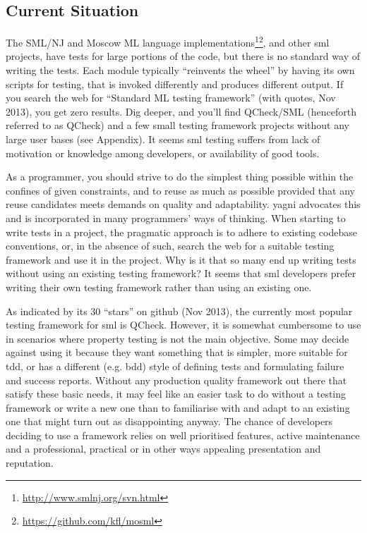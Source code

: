 \documentclass[11pt]{article}
\begin{document}
\subsection{Current Situation}

The SML/NJ and Moscow ML language implementations\footnote{\url{http://www.smlnj.org/svn.html}}\footnote{\url{https://github.com/kfl/mosml}}, and other \gls{sml} projects, have tests for large portions of the code, but there is no standard way of writing the tests. Each module typically ``reinvents the wheel'' by having its own scripts for testing, that is invoked differently and produces different output. If you search the web for ``Standard ML testing framework'' (with quotes, Nov 2013), you get zero results. Dig deeper, and you'll find QCheck/SML (henceforth referred to as QCheck) and a few small testing framework projects without any large user bases (see Appendix). It seems \gls{sml} testing suffers from lack of motivation or knowledge among developers, or availability of good tools. %

As a programmer, you should strive to do the simplest thing possible within the confines of given constraints, and to reuse as much as possible provided that any reuse candidates meets demands on quality and adaptability. \Gls{yagni} advocates this and is incorporated in many programmers' ways of thinking. When starting to write tests in a project, the pragmatic approach is to adhere to existing codebase conventions, or, in the absence of such, search the web for a suitable testing framework and use it in the project. Why is it that so many end up writing tests without using an existing testing framework? It seems that \gls{sml} developers prefer writing their own testing framework rather than using an existing one.

As indicated by its 30 ``stars'' on github (Nov 2013), the currently most popular testing framework for \gls{sml} is QCheck. However, it is somewhat cumbersome to use in scenarios where property testing is not the main objective. Some may decide against using it because they want something that is simpler, more suitable for \gls{tdd}, or has a different (e.g. \gls{bdd}) style of defining tests and formulating failure and success reports. Without any production quality framework out there that satisfy these basic needs, it may feel like an easier task to do without a testing framework or write a new one than to familiarise with and adapt to an existing one that might turn out as disappointing anyway. The chance of developers deciding to use a framework relies on well prioritised features, active maintenance and a professional, practical or in other ways appealing presentation and reputation.
\end{document}
